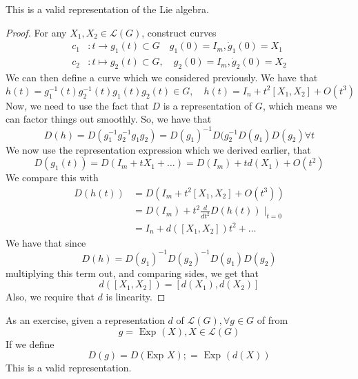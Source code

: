 \begin{claim}
	This is a valid representation 
	of the Lie algebra. 

\begin{proof}
	For any $ X _ 1 , X _ 2 \in \mathcal{ L } ( G ) $, 
	construct curves 
	\begin{align*}
		c_1 & : t \to g_ 1 ( t ) \subset G \quad g_1 ( 0 )  = I_ m, \dot{g }_ 1  ( 0 ) = X_ 1   \\
		c_ 2 & : t \mapsto g _ 2 ( t) \subset G , \quad g _ 2 ( 0 ) = I _ m, \dot{ g } _ 2 ( 0 ) = X_ 2  
	\end{align*}
	We can then define a curve which we 
	considered previously. We have that 
	\[
		h ( t) = g_1 ^{ - 1} ( t) g _ 2 ^{ - 1} ( t) g_ 1 ( t) g _ 2 ( t ) \in G, \quad h ( t) = I _ n + t ^ 2 [ X_1, X_2 ] + O ( t^ 3 ) 
	\] Now, we need to use the fact 
	that $ D $ is a representation of $ G $, which means 
	we can factor things out smoothly. 
	So, we have that 
	\[ 
		D ( h ) = D ( g_1 ^{ - 1 } g_2  ^{ -1 } g_1 g_2 ) = D ( g_1 )  ^{ - 1} D ( g_ 2 ^{ - 1} D ( g_1 ) D( g_2) \forall t 
	\] We now use the representation expression which 
	we derived earlier, that 
	\[
		D ( g_1 ( t ) ) = D ( I _ m + t X_1 + \dots ) = D ( I _ m ) + t d ( X_1 ) + O ( t ^ 2 ) 
	\] We compare this with 
	\begin{align*}
		D ( h ( t ) ) & = D ( I _ m  + t ^ 2 [ X_1 , X_2 ] + O ( t ^ 3 ) ) \\
			      &=  D ( I _ m ) + t ^ 2 \frac{ d }{ dt ^ 2 } D ( h ( t ) ) \mid_{ t = 0 } \\
			      &=  I _ n + d ( [ X_1 , X_2 ] ) t ^ 2 + \dots  
	\end{align*}
	We have that since
	\[
		D ( h ) = D ( g_1 ) ^{ -1 } D ( g_2 ) ^{ - 1} D ( g_1) D ( g_2) 
	\] multiplying this term out, and comparing sides, we get that 
	\[
		d ( [ X_1 , X_2 ] ) = [ d ( X_1 ) , d ( X_2 ) ] 
	\] Also, we require that $ d  $ is linearity.  
\end{proof}
\end{claim}

As an exercise, given a representation $d $ of 
$ \mathcal{L  } ( G ) , \forall g \in G $  of
from 
\[
	g = \text{ Exp } ( X ), X \in \mathcal{ L } ( G ) 
\] If we define 
\[
	D ( g ) = D ( \text{Exp } X ) ;= \text{ Exp } ( d ( X) ) 
\] This is a valid representation. 


